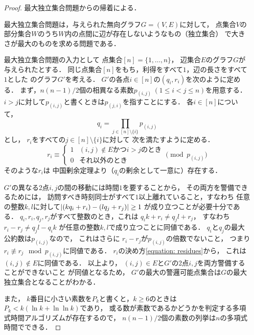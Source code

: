 \begin{proof}
  最大独立集合問題からの帰着による．

  最大独立集合問題は，与えられた無向グラフ$G = (V, E)$に対して，
  点集合$V$の部分集合$W$のうち$W$内の点間に辺が存在しないようなもの（独立集合）
  で大きさが最大のものを求める問題である．

  \newcommand{\primenum}[2]{p_{(#1,#2)}}
  最大独立集合問題の入力として
  点集合$[n] = \{1, \ldots, n\}$，
  辺集合$E$のグラフ$G$が与えられたとする．
  同じ点集合$[n]$をもち，利得をすべて$1$，辺の長さをすべて$1$とした
  {\graphUnit}のグラフ$G'$を考える．
  $G'$の各点$i \in [n]$の{\exactIdletime}$(q_i, r_i)$を次のように定める．
  まず，$n(n - 1)/2$個の相異なる素数$\primenum{i}{j}\ (1 \leq i < j \leq n)$を用意する．
  $i > j$に対して$\primenum{i}{j}$と書くときは$\primenum{j}{i}$を指すことにする．
  各$i \in [n]$について，
  \begin{equation}
    q_i = \prod_{j \in [n] \setminus \{i\}} \primenum{i}{j}
  \end{equation}
  とし，
  $r _i$をすべての$j \in [n] \setminus \{i\}$に対して
  次を満たすように定める．
  \begin{equation}
    \label{equation: residues}
    r _i
    \equiv
    \begin{cases}
      1 & \text{$(i, j) \notin E$かつ$i > j$のとき} \\
      0 & \text{それ以外のとき}
    \end{cases}
    \pmod{p _{(i, j)}}
  \end{equation}
  そのような$r _i$は
  中国剰余定理より（$q _i$の剰余として一意に）存在する\cite{}．

  $G'$の異なる2点$i, j$の間の移動には時間$1$を要することから，
  その両方を警備できるためには，
  訪問すべき時刻同士がすべて$1$以上離れていること，すなわち
  任意の整数$k, l$に対して$\lvert{(k q_i + r_i) - (l q_j + r_j)}\rvert \geq 1$%
  が成り立つことが必要十分である．
  $q_i, r_i, q_j, r_j$がすべて整数のとき，これは
  $q_i k + r_i \neq q_j l + r_j$，
  すなわち
  $r_i - r_j \neq q_j l - q_i k$%
  が任意の整数$k, l$で成り立つことに同値である．
  $q _i$と$q _j$の最大公約数は$p _{(i, j)}$なので，
  これはさらに
  $r_i - r_j$が$p _{(i, j)}$の倍数でないこと，
  つまり$r_i \not\equiv r_j \mod p _{(i, j)}$に同値である．
  $r_i$の決め方\eqref{equation: residues}から，
  これは$(i, j) \notin E$に同値である．
  以上より，
  $(i, j) \in E$と$G'$の2点$i, j$を両方警備することができないこと
  が同値となるため，
  $G'$の最大の警邏可能点集合は$G$の最大独立集合となることがわかる．

  また，
  $k$番目に小さい素数を$P_k$と書くと，$k \geq 6$のときは
  $P_k < k( \ln k + \ln\ln k )$であり\cite{dusart1999k}，
  或る数が素数であるかどうかを判定する多項式時間アルゴリズムが存在する\cite{agrawal2004primes}ので，
  $n(n - 1)/2$個の素数の列挙は$n$の多項式時間でできる．
\end{proof}

